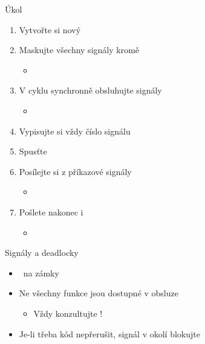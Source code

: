 \begin{frame}{Úkol}

  \begin{enumerate}
    \item Vytvořte si nový 

    \item Maskujte všechny signály kromě 
    \begin{itemize}
      \item {}
    \end{itemize}

    \item V cyklu synchronně obsluhujte signály
    \begin{itemize}
      \item {}
    \end{itemize}

    \item Vypisujte si vždy číslo signálu

    \item Spusťte

    \item Posílejte si z příkazové signály
    \begin{itemize}
      \item {}
    \end{itemize}

    \item Pošlete nakonec i 
    \begin{itemize}
      \item {}
    \end{itemize}
  \end{enumerate}

\end{frame}

\begin{frame}{Signály a deadlocky}

  \begin{itemize}
    \item \pozor\ na zámky

    \pause

    \item Ne všechny funkce jsou dostupné v obsluze
    \begin{itemize}
      \item Vždy konzultujte !
    \end{itemize}

    \pause

    \item Je-li třeba kód nepřerušit, signál v okolí blokujte
  \end{itemize}

\end{frame}

